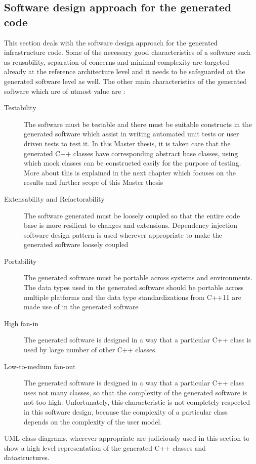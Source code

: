 \subsection{Software design approach for the generated code}
\label{subsection: Software design approach}
This section deals with the software design approach for the generated infrastructure code. Some of the necessary good characteristics of a software such as reusability, separation of concerns and minimal complexity are targeted already at the reference architecture level and it needs to be safeguarded at the generated software level as well. The other main characteristics of the generated software which are of utmost value are \cite{CodeComplete}:
\begin{description}
\item [Testability] The software must be testable and there must be suitable constructs in the generated software which assist in writing automated unit tests or user driven tests to test it. In this Master thesis, it is taken care that the generated C++ classes have corresponding abstract base classes, using which mock classes can be constructed easily for the purpose of testing. More about this is explained in the next chapter which focuses on the results and further scope of this Master thesis
\item [Extensability and Refactorability] The software generated must be loosely coupled so that the entire code base is more resilient to changes and extensions. Dependency injection software design pattern \cite{InvOfCntrlurl} is used wherever appropriate to make the generated software loosely coupled
\item [Portability] The generated software must be portable across systems and environments. The data  types used in the generated software should be portable across multiple platforms and the data type standardizations from C++11 are made use of in the generated software
\item [High fan-in] The generated software is designed in a way that a particular C++ class is used by large number of other C++ classes.
\item [Low-to-medium fan-out] The generated software is designed in a way that a particular C++ class uses not many classes, so that the complexity of the generated software is not too high. Unfortunately, this characteristic is not completely respected in this software design, because the complexity of a particular class depends on the complexity of the user model.      
\end{description}
UML class diagrams, wherever appropriate are judiciously used in this section to show a high level representation of the generated C++ classes and datastructures. 

